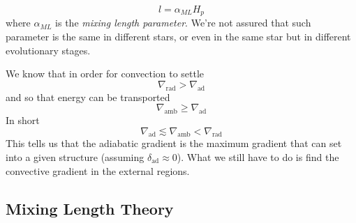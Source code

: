 \begin{equation*}
	l = \alpha_{ML}H_{p}
\end{equation*}
where $\alpha_{ML}$ is the \emph{mixing length parameter}. We're not assured that such parameter is the same in different stars, or even in the same star but in different evolutionary stages.
\par We know that in order for convection to settle
\begin{equation*}
	\nabla_{\text{rad}} > \nabla_{\text{ad}}
\end{equation*}
and so that energy can be transported 
\begin{equation*}
	\nabla_{\text{amb}} \geq \nabla_{\text{ad}}
\end{equation*}
In short 
\begin{equation*}
	\boxed{
		\nabla_{\text{ad}} \lesssim \nabla_{\text{amb}} < \nabla_{\text{rad}}
	}
\end{equation*}
This tells us that the adiabatic gradient is the maximum gradient that can set into a given structure (assuming $\delta_{\text{ad}}\approx 0$). What we still have to do is find the convective gradient in the external regions.

\subsection{Mixing Length Theory}

